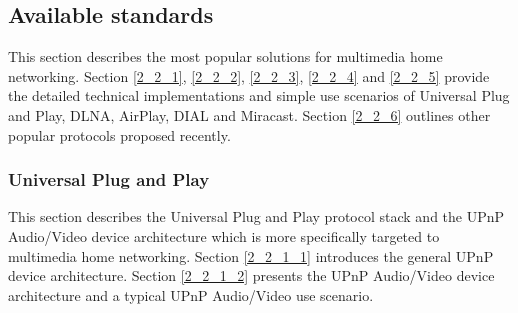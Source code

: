 \subsection{Available standards\label{2_2}} 
This section describes the most popular solutions for multimedia home networking. Section \ref{2_2_1}, \ref{2_2_2}, \ref{2_2_3}, \ref{2_2_4} and \ref{2_2_5} provide the detailed technical implementations and simple use scenarios of Universal Plug and Play, DLNA, AirPlay, DIAL and Miracast. Section \ref{2_2_6} outlines other popular protocols proposed recently.
\subsubsection[Universal Plug and Play]{Universal Plug and Play\label{2_2_1}}
This section describes the Universal Plug and Play protocol stack and the UPnP
Audio/Video device architecture which is more specifically targeted to
multimedia home networking. Section \ref{2_2_1_1} introduces the general UPnP device architecture. Section \ref{2_2_1_2} presents the UPnP Audio/Video device architecture and a typical UPnP Audio/Video use scenario.
